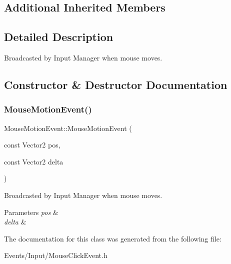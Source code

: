 \subsection*{Additional Inherited Members}


\subsection{Detailed Description}
Broadcasted by Input Manager when mouse moves. 

\subsection{Constructor \& Destructor Documentation}
\mbox{\label{classMouseMotionEvent_ae80aaa461c66ce8796d4ad3930bcc6e2}} 
\subsubsection{\texorpdfstring{Mouse\+Motion\+Event()}{MouseMotionEvent()}}
{\footnotesize\ttfamily Mouse\+Motion\+Event\+::\+Mouse\+Motion\+Event (\begin{DoxyParamCaption}\item[{const Vector2}]{pos,  }\item[{const Vector2}]{delta }\end{DoxyParamCaption})\hspace{0.3cm}{\ttfamily [inline]}}



Broadcasted by Input Manager when mouse moves. 


\begin{DoxyParams}{Parameters}
{\em pos} & \\
\hline
{\em delta} & \\
\hline
\end{DoxyParams}


The documentation for this class was generated from the following file\+:\begin{DoxyCompactItemize}
\item 
Events/\+Input/Mouse\+Click\+Event.\+h\end{DoxyCompactItemize}
